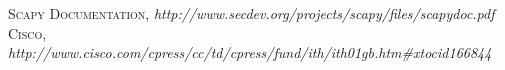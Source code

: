 \documentclass{udpreport}
\begin{document}
\begin{thebibliography}{x}
 \textsc{Scapy Documentation},
\textit{http://www.secdev.org/projects/scapy/files/scapydoc.pdf}
 \textsc{Cisco},
\textit{ http://www.cisco.com/cpress/cc/td/cpress/fund/ith/ith01gb.htm#xtocid166844}
\end{thebibliography}
\end{document}
